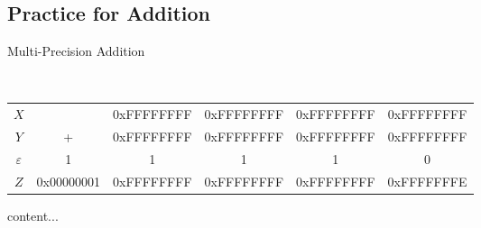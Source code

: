 \subsection{Practice for Addition}

\begin{algorithm}[H]
\DontPrintSemicolon
\caption{Multi-Precision Addition}
\BlankLine
{}
\end{algorithm}
\begin{example}
\ \begin{table}[h!]\centering\renewcommand{\arraystretch}{1.25}
	{\ttfamily\begin{tabular*}{\textwidth}{@{\extracolsep{\fill}}cccccc}
	$X$ & & 0xFFFFFFFF & 0xFFFFFFFF & 0xFFFFFFFF & 0xFFFFFFFF \\
	$Y$ & + & 0xFFFFFFFF & 0xFFFFFFFF & 0xFFFFFFFF & 0xFFFFFFFF \\
	$\varepsilon$ & 1 & 1 & 1 & 1 & 0 \\ \cline{2-6}
	$Z$ & 0x00000001 & 0xFFFFFFFF & 0xFFFFFFFF & 0xFFFFFFFF & 0xFFFFFFFE \\
	\end{tabular*}}
\end{table}
\end{example}

\begin{note}
	content...
\end{note}


